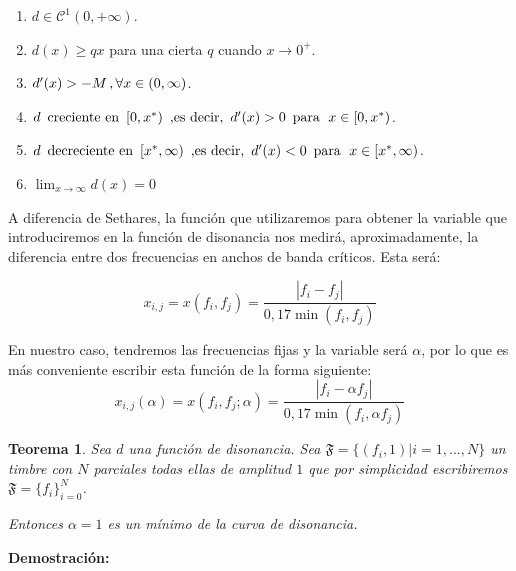 \documentclass[11pt,a4paper]{article}
\newtheorem{teor}{Teorema}
\begin{document}
	\begin{enumerate}
	    \item $d \in \mathcal{C}^1 (0, +\infty)$.
	    \item $d(x) \geq qx$ para una cierta $q$ cuando $x \rightarrow 0^{+}$.
	    \item $d'(x) > - M \, \textnormal{,} \, \forall x \in (0, \infty)$.
	    \item $d \textnormal{\, creciente en \,} [0, x^{*})\textnormal{\, ,es decir, \,} d'(x) > 0 \textnormal{\, para \;} x \in [0, x^{*})$.
	    \item $d \textnormal{\, decreciente en \,} [x^{*}, \infty)\textnormal{\, ,es decir, \,} d'(x) < 0 \textnormal{\, para \;} x \in [x^{*}, \infty)$.
	    \item $\lim_{x \to \infty} d(x) = 0$
	\end{enumerate}
	
	
	A diferencia de Sethares, la función que utilizaremos para obtener la variable que introduciremos en la función de disonancia nos medirá, aproximadamente, la diferencia entre dos frecuencias en anchos de banda críticos. Esta será:
	
	$$
	    x_{i,j} = x(f_i,f_j) = \frac{|f_i - f_j|}{0,17 \min{(f_i,f_j)}}
	$$
	
	En nuestro caso, tendremos las frecuencias fijas y la variable será $\alpha$,  por lo que es más conveniente escribir esta función de la forma siguiente:
	$$
	\boxed{
	x_{i,j} (\alpha) = x(f_i,f_j; \alpha)  = \frac{|f_i - \alpha f_j|}{0,17 \min{(f_i,\alpha f_j)}}
	}
	$$
	
	\begin{teor}
	Sea $d$ una función de disonancia. Sea $\mathfrak{F} = \{(f_i,1) | i = 1,..., N\}$ un timbre con $N$ parciales todas ellas de amplitud $1$ que por simplicidad escribiremos $\mathfrak{F} = \{f_i\}_{i=0}^{N}$.%
	
	\noindent Entonces $\alpha = 1$ es un mínimo de la curva de disonancia.
	\end{teor}
	
	\noindent\textbf{Demostración:} 
	
\end{document}
